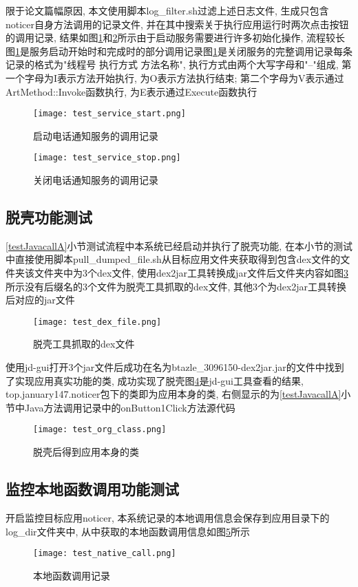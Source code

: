 限于论文篇幅原因, 本文使用脚本log\_filter.sh过滤上述日志文件, 生成只包含noticer自身方法调用的记录文件, 并在其中搜索关于执行应用运行时两次点击按钮的调用记录, 结果如图\ref{testServiceStart}和\ref{testServiceStop}所示\juhao 由于启动服务需要进行许多初始化操作, 流程较长图\ref{testServiceStart}是服务启动开始时和完成时的部分调用记录\juhao 图\ref{testServiceStart}是关闭服务的完整调用记录\juhao 每条记录的格式为"线程号 执行方式 方法名称", 执行方式由两个大写字母和"--"组成, 第一个字母为I表示方法开始执行, 为O表示方法执行结束; 第二个字母为V表示通过ArtMethod::Invoke函数执行, 为E表示通过Execute函数执行\juhao 
\begin{figure}[ht]
	\centering
	\texttt{[image: test\_service\_start.png]}
	\caption{启动电话通知服务的调用记录}
	\label{testServiceStart}
\end{figure}
\begin{figure}[ht]
	\centering
	\texttt{[image: test\_service\_stop.png]}
	\caption{关闭电话通知服务的调用记录}
	\label{testServiceStop}
\end{figure}

\subsection{脱壳功能测试}
\ref{testJavacallA}小节测试流程中本系统已经启动并执行了脱壳功能, 在本小节的测试中直接使用脚本pull\_dumped\_file.sh从目标应用文件夹获取得到包含dex文件的文件夹\juhao 该文件夹中为3个dex文件, 使用dex2jar工具转换成jar文件后文件夹内容如图\ref{testDexFile}所示\juhao 没有后缀名的3个文件为脱壳工具抓取的dex文件, 其他3个为dex2jar工具转换后对应的jar文件\juhao 
\begin{figure}[ht]
	\centering
	\texttt{[image: test\_dex\_file.png]}
	\caption{脱壳工具抓取的dex文件}
	\label{testDexFile}
\end{figure}

使用jd-gui打开3个jar文件后成功在名为btazle\_3096150-dex2jar.jar的文件中找到了实现应用真实功能的类, 成功实现了脱壳\juhao 图\ref{testOrgClass}是jd-gui工具查看的结果, top.january147.noticer包下的类即为应用本身的类, 右侧显示的为\ref{testJavacallA}小节中Java方法调用记录中的onButton1Click方法源代码\juhao 
\begin{figure}[ht]
	\centering
	\texttt{[image: test\_org\_class.png]}
	\caption{脱壳后得到应用本身的类}
	\label{testOrgClass}
\end{figure}

\subsection{监控本地函数调用功能测试}
开启监控目标应用noticer, 本系统记录的本地调用信息会保存到应用目录下的log\_dir文件夹中, 从中获取的本地函数调用信息如图\ref{testNativeCall}所示\juhao 
\begin{figure}[ht]
	\centering
	\texttt{[image: test\_native\_call.png]}
	\caption{本地函数调用记录}
	\label{testNativeCall}
\end{figure}

